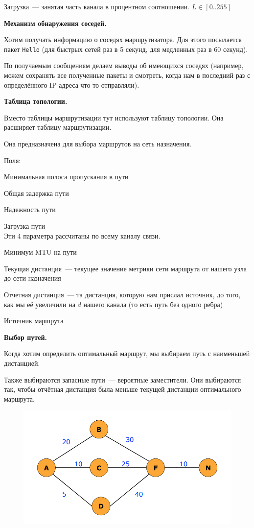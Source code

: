 Загрузка~--- занятая часть канала в процентном соотношении. $L\in[0..255]$

{\bf Механизм обнаружения соседей.}

Хотим получать информацию о соседях маршрутизатора. Для этого посылается пакет {\tt Hello} (для быстрых сетей раз в 5 секунд, для медленных раз в 60 секунд).

По получаемым сообщениям делаем выводы об имеющихся соседях (например, можем сохранять все полученные пакеты и смотреть, когда нам в последний раз с определённого IP-адреса что-то отправляли).

{\bf Таблица топологии.}

Вместо таблицы маршрутизации тут используют таблицу топологии. Она расширяет таблицу маршрутизации.

Она предназначена для выбора маршрутов на сеть назначения.

Поля:
\begin{MyItemize}
    \item Минимальная полоса пропускания в пути
    \item Общая задержка пути
    \item Надежность пути
    \item Загрузка пути\\
    Эти 4 параметра рассчитаны по всему каналу связи.
    \item Минимум MTU на пути
    \item Текущая дистанция~--- текущее значение метрики сети маршрута от нашего узла до сети назначения
    \item Отчетная дистанция~--- та дистанция, которую нам прислал источник, до того, как мы её увеличили на $d$ нашего канала (то есть путь без одного ребра)
    \item Источник маршрута
\end{MyItemize}

{\bf Выбор путей.}

Когда хотим определить оптимальный маршрут, мы выбираем путь с наименьшей дистанцией.

Также выбираются запасные пути~--- вероятные заместители. Они выбираются так, чтобы отчётная дистанция была меньше текущей дистанции оптимального маршрута.

\begin{figure}[H]
  \centering
  \includegraphics[width=15cm]{images/04/09}
\end{figure}

